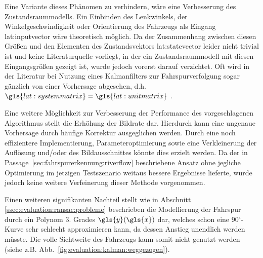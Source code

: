 Eine Variante dieses Phänomen zu verhindern, wäre eine Verbesserung des Zustandsraummodells. 
Ein Einbinden des Lenkwinkels, der Winkelgeschwindigkeit oder Orientierung des Fahrzeugs als Eingang \gls{lat:inputvector} wäre theoretisch möglich. Da der Zusammenhang zwischen diesen Größen und den Elementen des Zustandsvektors \gls{lat:statevector} leider nicht trivial ist und keine Literaturquelle vorliegt, in der ein Zustandsraummodell mit diesen Eingangsgrößen gezeigt ist, wurde jedoch vorerst darauf verzichtet. Oft wird in der Literatur bei Nutzung eines Kalmanfilters zur Fahrspurverfolgung sogar gänzlich von einer Vorhersage abgesehen, d.h. \(\gls{lat:systemmatrix}=\gls{lat:unitmatrix}\) \autocite{limRiverFlowLane2012}.

Eine weitere Möglichkeit zur Verbesserung der Performance des vorgeschlagenen Algorithmus stellt die Erhöhung der Bildrate dar. Hierdurch kann eine ungenaue Vorhersage durch häufige Korrektur ausgeglichen werden. Durch eine noch effizientere Implementierung, Parameteroptimierung sowie eine Verkleinerung der Auflösung und/oder des Bildausschnittes könnte dies erzielt werden. Da der in Passage~\ref{sec:fahrspurerkennung:riverflow} beschriebene Ansatz ohne jegliche Optimierung im jetzigen Testszenario weitaus bessere Ergebnisse lieferte, wurde jedoch keine weitere Verfeinerung dieser Methode vorgenommen.

Einen weiteren signifikanten Nachteil stellt wie in Abschnitt \ref{ssec:evaluation:ransac:probleme} beschrieben die Modellierung der Fahrspur durch ein Polynom 3. Grades \(\gls{y}(\gls{x})\) dar, welches schon eine 90\(^\circ\)-Kurve sehr schlecht approximieren kann, da dessen Anstieg unendlich werden müsste. Die volle Sichtweite des Fahrzeugs kann somit nicht genutzt werden (siehe z.B. Abb.~\ref{fig:evaluation:kalman:weggezogen}).
